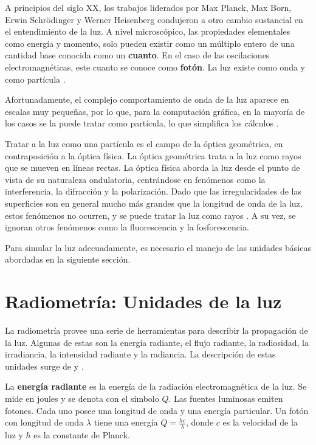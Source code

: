 A principios del siglo XX, los trabajos liderados por Max Planck, Max Born, Erwin Schrödinger y Werner Heisenberg condujeron a otro cambio sustancial en el entendimiento de la luz.
A nivel microscópico, las propiedades elementales como energía y momento, solo pueden existir como un múltiplo entero de una cantidad base conocida como un \textbf{cuanto}.
En el caso de las oscilaciones electromagnéticas, este cuanto se conoce como \textbf{fotón}.
La luz existe como onda y como partícula \cite{quantum-light}.

Afortunadamente, el complejo comportamiento de onda de la luz aparece en escalas muy pequeñas, por lo que, para la computación gráfica, en la mayoría de los casos se la puede tratar como partícula, lo que simplifica los cálculos \cite[p.~303]{rtr}.

Tratar a la luz como una partícula es el campo de la óptica geométrica, en contraposición a la óptica física.
La óptica geométrica trata a la luz como rayos que se mueven en líneas rectas.
La óptica física aborda la luz desde el punto de vista de su naturaleza ondulatoria, centrándose en fenómenos como la interferencia, la difracción y la polarización.
Dado que las irregularidades de las superficies son en general mucho más grandes que la longitud de onda de la luz, estos fenómenos no ocurren, y se puede tratar la luz como rayos \cite[p.~303]{rtr}.
A su vez, se ignoran otros fenómenos como la fluorescencia y la fosforescencia.

Para simular la luz adecuadamente, es necesario el manejo de las unidades básicas abordadas en la siguiente sección.


\section{Radiometría: Unidades de la luz}\label{sec:radiometry}

La radiometría provee una serie de herramientas para describir la propagación de la luz.
Algunas de estas son la energía radiante, el flujo radiante, la radiosidad, la irradiancia, la intensidad radiante y la radiancia.
La descripción de estas unidades surge de \cite[p.~268]{rtr} y \cite[p.~177]{pbr}.

La \textbf{energía radiante} es la energía de la radiación electromagnética de la luz.
Se mide en joules y se denota con el símbolo $Q$.
Las fuentes luminosas emiten fotones.
Cada uno posee una longitud de onda y una energía particular.
Un fotón con longitud de onda $\lambda$ tiene una energía $Q = \frac{hc}{\lambda}$, donde $c$ es la velocidad de la luz y $h$ es la constante de Planck.

